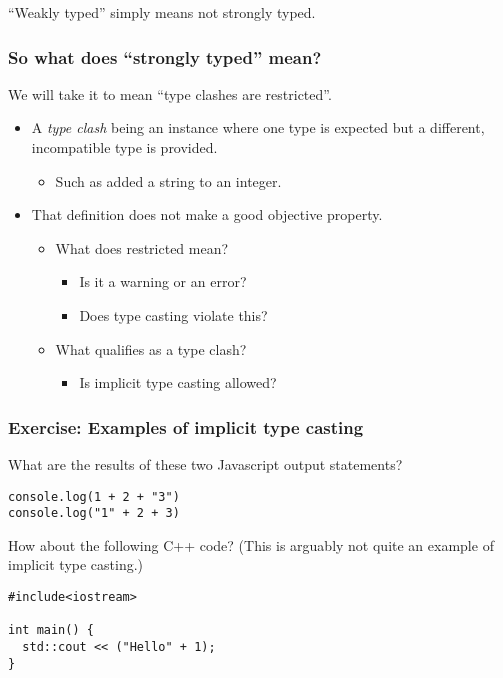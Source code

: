 \documentclass[11pt]{article}
\theoremstyle{definition}
\begin{document}
“Weakly typed” simply means not strongly typed.

\subsubsection{So what does “strongly typed” mean?}
\label{sec:orgee4dc06}

We will take it to mean “type clashes are restricted”.
\begin{itemize}
\item A \emph{type clash} being an instance where one type is expected
but a different, incompatible type is provided.
\begin{itemize}
\item Such as added a string to an integer.
\end{itemize}
\item That definition does not make a good objective property.
\begin{itemize}
\item What does restricted mean?
\begin{itemize}
\item Is it a warning or an error?
\item Does type casting violate this?
\end{itemize}
\item What qualifies as a type clash?
\begin{itemize}
\item Is implicit type casting allowed?
\end{itemize}
\end{itemize}
\end{itemize}

\subsubsection{Exercise: Examples of implicit type casting}
\label{sec:org9605ba6}

What are the results of these two Javascript output statements?
\begin{verbatim}
console.log(1 + 2 + "3")
console.log("1" + 2 + 3)
\end{verbatim}

How about the following C++ code?
(This is arguably not quite an example of implicit type casting.)
\begin{verbatim}
#include<iostream>

int main() {
  std::cout << ("Hello" + 1);
}
\end{verbatim}
\end{document}
